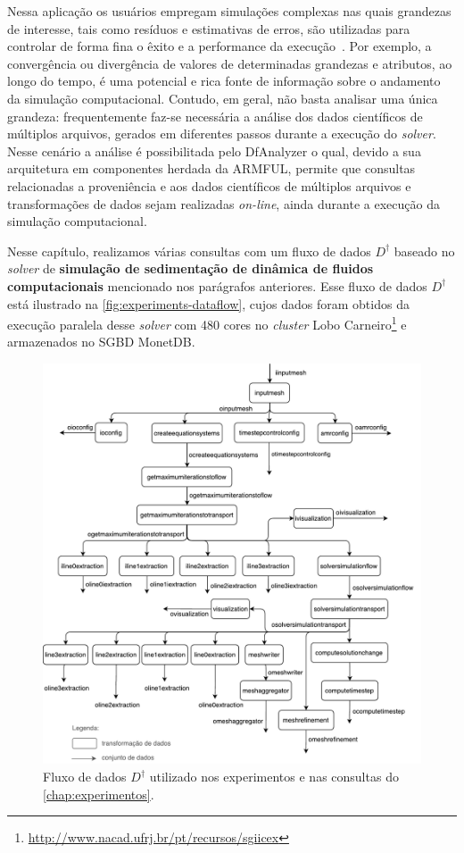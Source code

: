 Nessa aplicação os usuários empregam simulações complexas nas quais grandezas de interesse, tais como resíduos e estimativas de erros, são utilizadas para controlar de forma fina o êxito e a performance da execução~\cite{silva2016situ}. Por exemplo, a convergência ou divergência de valores de determinadas grandezas e atributos, ao longo do tempo, é uma potencial e rica fonte de informação sobre o andamento da simulação computacional. Contudo, em geral, não basta analisar uma única grandeza: frequentemente faz-se necessária a análise dos dados científicos de múltiplos arquivos, gerados em diferentes passos durante a execução do \textit{solver}. Nesse cenário a análise é possibilitada pelo DfAnalyzer o qual, devido a sua arquitetura em componentes herdada da ARMFUL, permite que consultas relacionadas a proveniência e aos dados científicos de múltiplos arquivos e transformações de dados sejam realizadas \textit{on-line}, ainda durante a execução da simulação computacional.

Nesse capítulo, realizamos várias consultas com um fluxo de dados \(D^{\dagger}\) baseado no \textit{solver} de \textbf{simulação de sedimentação de dinâmica de fluidos computacionais} mencionado nos parágrafos anteriores. Esse fluxo de dados \(D^{\dagger}\) está ilustrado na \autoref{fig:experiments-dataflow}, cujos dados foram obtidos da execução paralela desse \textit{solver} com 480 cores no \textit{cluster} Lobo Carneiro\footnote{\url{http://www.nacad.ufrj.br/pt/recursos/sgiicex}} e armazenados no SGBD MonetDB.

\begin{figure}[!htb]
    \centering
    \includegraphics[width=\textwidth]{img/experiments-dataflow}
    \caption[Fluxo de dados $D^{\dagger}$ utilizado nos experimentos]{Fluxo de dados $D^{\dagger}$ utilizado nos experimentos e nas consultas do \autoref{chap:experimentos}.}%
    \label{fig:experiments-dataflow}
\end{figure}

